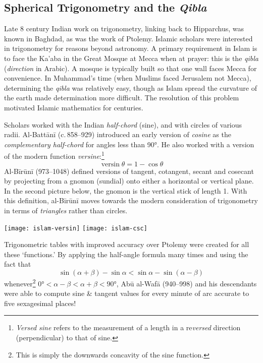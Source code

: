 \clearpage



\subsection{Spherical Trigonometry and the \emph{Qibla}}

Late 8\th{} century Indian work on trigonometry, linking back to Hipparchus, was known in Baghdad, as was the work of Ptolemy. Islamic scholars were interested in trigonometry for reasons beyond astronomy. A primary requirement in Islam is to face the Ka'aba in the Great Mosque at Mecca when at prayer: this is the \emph{qibla} (\emph{direction} in Arabic). A mosque is typically built so that one wall faces Mecca for convenience. In Muhammad's time (when Muslims faced Jerusalem not Mecca), determining the \emph{qibla} was relatively easy, though as Islam spread the curvature of the earth made determination more difficult. The resolution of this problem motivated Islamic mathematics for centuries.




Scholars worked with the Indian \emph{half-chord} (sine), and with circles of various radii. Al-Battānī (c.\,858--929) introduced an early version of \emph{cosine} as the \emph{complementary half-chord} for angles less than \ang{90}. He also worked with a version of the modern function \emph{versine}:\footnote{\emph{Versed sine} refers to the measurement of a length in a re\emph{versed} direction (perpendicular) to that of sine.}
\[
	\operatorname{versin}\theta=1-\cos\theta
\]
Al-Bīrūnī (973--1048) defined versions of tangent, cotangent, secant and cosecant by projecting from a gnomon (sundial) onto either a horizontal or vertical plane. In the second picture below, the gnomon is the vertical stick of length 1. With this definition, al-Bīrūnī moves towards the modern consideration of trigonometry in terms of \emph{triangles} rather than circles.
\begin{center}
  \texttt{[image: islam-versin]}\qquad\qquad
  \texttt{[image: islam-csc]}
\end{center}\label{pg:sineconcave}

Trigonometric tables with improved accuracy over Ptolemy were created for all these `functions.' By applying the half-angle formula many times and using the fact that
\[
	\sin(\alpha+\beta)-\sin\alpha<\sin\alpha-\sin(\alpha-\beta)
\]
whenever\footnote{This is simply the downwards concavity of the sine function.} $\ang{0}<\alpha-\beta<\alpha+\beta<\ang{90}$, Abū al-Wafā (940--998) and his descendants were able to compute sine \& tangent values for every minute of arc accurate to five sexagesimal places!
\goodbreak


